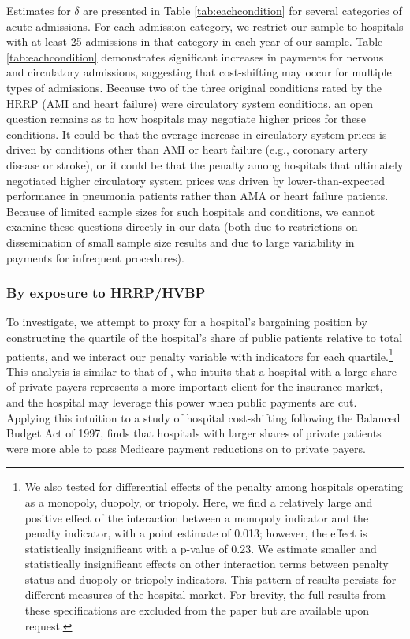 \documentclass[12pt]{article}
\begin{document}
Estimates for $\delta$ are presented in Table \ref{tab:eachcondition} for several categories of acute admissions. For each admission category, we restrict our sample to hospitals with at least 25 admissions in that category in each year of our sample. Table \ref{tab:eachcondition} demonstrates significant increases in payments for nervous and circulatory admissions, suggesting that cost-shifting may occur for multiple types of admissions. Because two of the three original conditions rated by the HRRP (AMI and heart failure) were circulatory system conditions, an open question remains as to how hospitals may negotiate higher prices for these conditions. It could be that the average increase in circulatory system prices is driven by conditions other than AMI or heart failure (e.g., coronary artery disease or stroke), or it could be that the penalty among hospitals that ultimately negotiated higher circulatory system prices was driven by lower-than-expected performance in pneumonia patients rather than AMA or heart failure patients. Because of limited sample sizes for such hospitals and conditions, we cannot examine these questions directly in our data (both due to restrictions on dissemination of small sample size results and due to large variability in payments for infrequent procedures).


\subsubsection*{By exposure to HRRP/HVBP}
To investigate, we attempt to proxy for a hospital's bargaining position by constructing the quartile of the hospital's share of public patients relative to total patients, and we interact our penalty variable with indicators for each quartile.\footnote{We also tested for differential effects of the penalty among hospitals operating as a monopoly, duopoly, or triopoly. Here, we find a relatively large and positive effect of the interaction between a monopoly indicator and the penalty indicator, with a point estimate of 0.013; however, the effect is statistically insignificant with a p-value of 0.23. We estimate smaller and statistically insignificant effects on other interaction terms between penalty status and duopoly or triopoly indicators. This pattern of results persists for different measures of the hospital market. For brevity, the full results from these specifications are excluded from the paper but are available upon request.} This analysis is similar to that of \cite{wu2010}, who intuits that a hospital with a large share of private payers represents a more important client for the insurance market, and the hospital may leverage this power when public payments are cut. Applying this intuition to a study of hospital cost-shifting following the Balanced Budget Act of 1997, \cite{wu2010} finds that hospitals with larger shares of private patients were more able to pass Medicare payment reductions on to private payers.
\end{document}
